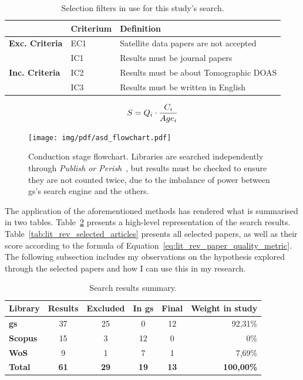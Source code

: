 \begin{table}[htb]
\centering
\caption{Selection filters in use for this study's search.}
\label{tab:lit_rev_filters}
\begin{tabularx}{\textwidth}{lXl}%
\toprule
\multicolumn{1}{l}{} & \textbf{Criterium} & \textbf{Definition} \\ \midrule
\multirow{1}{*}{\textbf{Exc. Criteria}} & EC1 & Satellite data papers
are not accepted \\
\midrule
\multicolumn{1}{l}{\multirow{3}{*}{\textbf{Inc. Criteria}}} & IC1 &
Results must be journal papers \\
\multicolumn{1}{l}{} & IC2 & Results must be about Tomographic DOAS \\ 
\multicolumn{1}{l}{} & IC3 & Results must be written in English \\ 
\bottomrule
\end{tabularx}
\end{table}

\begin{equation}
    \centering
    \label{eq:lit_rev_paper_quality_metric}
    S = Q_{i} \cdot \frac{C_{i}}{Age_{i}}
\end{equation}

\begin{figure}[htpb]
    \centering
    \texttt{[image: img/pdf/asd\_flowchart.pdf]}
    \caption{Conduction stage flowchart. Libraries are searched
    independently through \emph{Publish or Perish}~\cite{Harzing}, but
    results must be checked to ensure they are not counted twice, due to the
    imbalance of power between \gls{gs}'s search engine and the others.}
    \label{fig:lit_rev_search_flowchart}
\end{figure}

The application of the aforementioned methods has rendered what is
summarised in two tables. Table~\ref{tab:lit_rev_high_level_results}
presents a high-level representation of the search results.
Table~\ref{tab:lit_rev_selected_articles} presents all selected papers,
as well as their score according to the formula of
Equation~\ref{eq:lit_rev_paper_quality_metric}. The following subsection
includes my observations on the hypothesis explored through the selected
papers and how I can use this in my research.

\begin{table}[htb]
\centering
\caption{Search results summary.}
\label{tab:lit_rev_high_level_results}
\begin{tabular}{@{}lccccr@{}}
\toprule
\textbf{Library} & \textbf{Results} & \textbf{Excluded} & \textbf{In \gls{gs}} & \textbf{Final} & \textbf{Weight in study} \\ \midrule
\textbf{\gls{gs}} & 37 & 25 & 0 & 12 & 92,31\% \\
\textbf{Scopus} & 15 & 3 & 12 & 0 & 0\% \\
\textbf{WoS} & 9 & 1 & 7 & 1 & 7,69\% \\
\midrule
\textbf{Total}& \textbf{61} & \textbf{29} & \textbf{19} &\textbf{13} & \textbf{100,00\%} \\ \bottomrule
\end{tabular}
\end{table}


